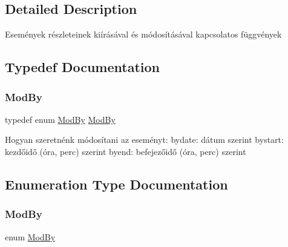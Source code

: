 \subsection{Detailed Description}
Események részleteinek kiírásával és módosításával kapcsolatos függvények 

\subsection{Typedef Documentation}
\mbox{\label{group__eventrecord_ga362ee478a7a01737cf42d32360eda02e}} 
\subsubsection{\texorpdfstring{Mod\+By}{ModBy}}
{\footnotesize\ttfamily typedef enum \hyperlink{group__eventrecord_ga643f8b09cbc45afc4ad36b27c077b1fd}{Mod\+By} \hyperlink{group__eventrecord_ga643f8b09cbc45afc4ad36b27c077b1fd}{Mod\+By}}

Hogyan szeretnénk módosítani az eseményt\+: bydate\+: dátum szerint bystart\+: kezdőidő (óra, perc) szerint byend\+: befejezőidő (óra, perc) szerint 

\subsection{Enumeration Type Documentation}
\mbox{\label{group__eventrecord_ga643f8b09cbc45afc4ad36b27c077b1fd}} 
\subsubsection{\texorpdfstring{Mod\+By}{ModBy}}
{\footnotesize\ttfamily enum \hyperlink{group__eventrecord_ga643f8b09cbc45afc4ad36b27c077b1fd}{Mod\+By}}

